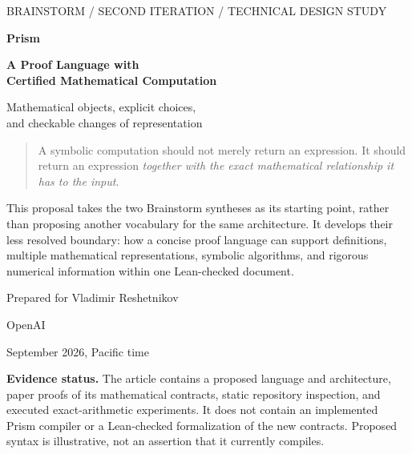 \documentclass[11pt,a4paper]{article}
\theoremstyle{definition}
\theoremstyle{remark}
\begin{document}
\begin{titlepage}
\vspace*{10mm}
{\sffamily\small\color{muted}BRAINSTORM / SECOND ITERATION / TECHNICAL DESIGN STUDY\par}
\vspace{14mm}
{\sffamily\bfseries\color{ink}\fontsize{32}{38}\selectfont Prism\par}
\vspace{4mm}
{\sffamily\bfseries\color{ink}\fontsize{23}{29}\selectfont A Proof Language with\\Certified Mathematical Computation\par}
\vspace{9mm}
{\sffamily\Large Mathematical objects, explicit choices,\\and checkable changes of representation\par}
\vspace{12mm}
\begin{quote}
\large A symbolic computation should not merely return an expression. It should return an expression \emph{together with the exact mathematical relationship it has to the input}.
\end{quote}
\vspace{8mm}
This proposal takes the two Brainstorm syntheses as its starting point, rather than proposing another vocabulary for the same architecture. It develops their less resolved boundary: how a concise proof language can support definitions, multiple mathematical representations, symbolic algorithms, and rigorous numerical information within one Lean-checked document.
\vfill
{\sffamily Prepared for Vladimir Reshetnikov\par}
{\sffamily OpenAI\par}
{ September 2026, Pacific time\par}
\vspace{5mm}
{\small\color{muted}\textbf{Evidence status.} The article contains a proposed language and architecture, paper proofs of its mathematical contracts, static repository inspection, and executed exact-arithmetic experiments. It does not contain an implemented Prism compiler or a Lean-checked formalization of the new contracts. Proposed syntax is illustrative, not an assertion that it currently compiles.\par}
\end{titlepage}
\end{document}
